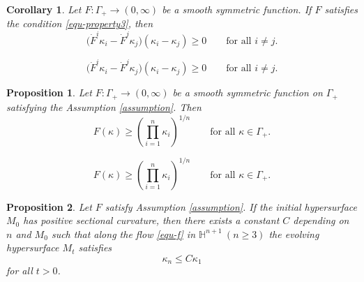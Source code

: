 \documentclass[10pt,a4paper]{amsart}
\newtheorem{corollary}{Corollary}
\newtheorem{proposition}{Proposition}
\begin{document}
\begin{corollary}\label{lem.cond-ii}
Let $F:\Gamma_+\to (0,\infty)$ be a smooth symmetric function. If $F$ satisfies the condition \eqref{equ-property3}, then 
\begin{equation}\label{eq:old-property2}
\big(\dot F^i\kappa_i-\dot F^j\kappa_j\big)(\kappa_i-\kappa_j)\ge 0
\qquad \text{for all } i\neq j.
\end{equation}
\end{corollary}

\begin{equation}
\big(\dot F^i\kappa_i-\dot F^j\kappa_j\big)(\kappa_i-\kappa_j)\ge 0
\qquad \text{for all } i\neq j.
\end{equation}

\begin{proposition}\label{lem:gm-lower-bound}
 Let $F:\Gamma_+\to (0,\infty)$ be a smooth symmetric function on $\Gamma_+$ satisfying the Assumption \ref{assumption}. Then
\begin{equation}\label{equ-f-lower}
F(\kappa)\ge \left(\prod_{i=1}^n \kappa_i\right)^{1/n}
\qquad \text{for all }\kappa\in \Gamma_+.
\end{equation}
\end{proposition}

\begin{equation}
F(\kappa)\ge \left(\prod_{i=1}^n \kappa_i\right)^{1/n}
\qquad \text{for all }\kappa\in \Gamma_+.
\end{equation}

\begin{proposition}\label{s4.lem-pinc}
	Let $F$ satisfy Assumption \ref{assumption}. If the initial hypersurface $M_0$ has positive sectional curvature, then there exists a constant $C$ depending on $n$ and $M_0$ such that along the flow \eqref{equ-f} in $\mathbb{H}^{n+1}\ (n\geq 3)$ the evolving hypersurface $M_t$ satisfies
	\begin{equation}
		\label{equ-pinching}
		\kappa_n \leq C \kappa_1
	\end{equation}
    for all $t>0$.
\end{proposition}
\end{document}
